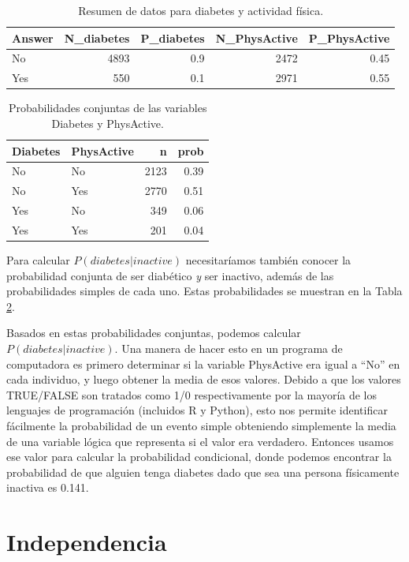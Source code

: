 \documentclass[
  12pt,
]{book}
\begin{document}
\begin{table}

\caption{\label{tab:simpleProb}Resumen de datos para diabetes y actividad física.}
\centering
\begin{tabular}[t]{l|r|r|r|r}
\hline
Answer & N\_diabetes & P\_diabetes & N\_PhysActive & P\_PhysActive\\
\hline
No & 4893 & 0.9 & 2472 & 0.45\\
\hline
Yes & 550 & 0.1 & 2971 & 0.55\\
\hline
\end{tabular}
\end{table}

\begin{table}

\caption{\label{tab:jointProb}Probabilidades conjuntas de las variables Diabetes y PhysActive.}
\centering
\begin{tabular}[t]{l|l|r|r}
\hline
Diabetes & PhysActive & n & prob\\
\hline
No & No & 2123 & 0.39\\
\hline
No & Yes & 2770 & 0.51\\
\hline
Yes & No & 349 & 0.06\\
\hline
Yes & Yes & 201 & 0.04\\
\hline
\end{tabular}
\end{table}

Para calcular \(P(diabetes|inactive)\) necesitaríamos también conocer la probabilidad conjunta de ser diabético \emph{y} ser inactivo, además de las probabilidades simples de cada uno. Estas probabilidades se muestran en la Tabla \ref{tab:jointProb}.

Basados en estas probabilidades conjuntas, podemos calcular \(P(diabetes|inactive)\). Una manera de hacer esto en un programa de computadora es primero determinar si la variable PhysActive era igual a ``No'' en cada individuo, y luego obtener la media de esos valores. Debido a que los valores TRUE/FALSE son tratados como 1/0 respectivamente por la mayoría de los lenguajes de programación (incluidos R y Python), esto nos permite identificar fácilmente la probabilidad de un evento simple obteniendo simplemente la media de una variable lógica que representa si el valor era verdadero. Entonces usamos ese valor para calcular la probabilidad condicional, donde podemos encontrar la probabilidad de que alguien tenga diabetes dado que sea una persona físicamente inactiva es 0.141.

\hypertarget{independencia}{%
\section{Independencia}\label{independencia}}
\end{document}
